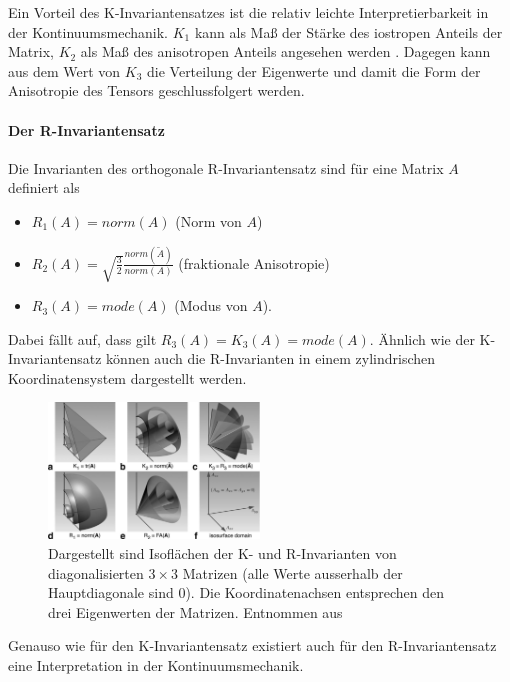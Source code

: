 \documentclass[a4paper,fontsize=12pt,toc=bib,halfparskip]{scrartcl}
\begin{document}
Ein Vorteil des K-Invariantensatzes ist die relativ leichte Interpretierbarkeit in der Kontinuumsmechanik. $K_1$ kann als Ma{\ss} der St\"arke des iostropen Anteils der Matrix, $K_2$ als Ma{\ss} des anisotropen Anteils angesehen werden \cite{kindlmann2007diffusion}. Dagegen kann aus dem Wert von $K_3$ die Verteilung der Eigenwerte und damit die Form der Anisotropie des Tensors geschlussfolgert werden.



\paragraph{Der R-Invariantensatz}
Die Invarianten des orthogonale R-Invariantensatz sind f\"ur eine Matrix $A$ definiert als

\begin{itemize}
	\item $R_1(A)=norm(A)$ (Norm von $A$)
	\item $R_2(A)=\sqrt{\frac{3}{2}} \frac{norm(\tilde{A})}{norm(A)}$ (fraktionale Anisotropie)
	\item $R_3(A)=mode(A)$ (Modus von $A$).
\end{itemize}

Dabei f\"allt auf, dass gilt $R_3(A) = K_3(A) = mode(A)$. \"Ahnlich wie der K-Invariantensatz k\"onnen auch die R-Invarianten in einem zylindrischen Koordinatensystem dargestellt werden.

\begin{figure}
	\centering
	\includegraphics[width=0.5\textwidth]{pictures/000.png}
	\caption{Dargestellt sind Isofl\"achen der K- und R-Invarianten von diagonalisierten $3\times 3$ Matrizen (alle Werte ausserhalb der Hauptdiagonale sind 0). Die Koordinatenachsen entsprechen den drei Eigenwerten der Matrizen. Entnommen aus \cite[S.~139]{ennis2006orthogonal}}
	\label{KRInvariants}
\end{figure}

Genauso wie f\"ur den K-Invariantensatz existiert auch f\"ur den R-Invariantensatz eine Interpretation in der Kontinuumsmechanik. 
\end{document}
